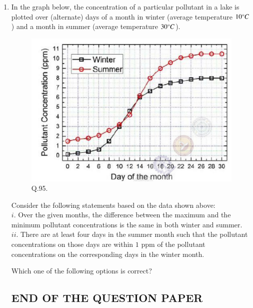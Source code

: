\documentclass[journal,12pt,onecolumn]{IEEEtran}
\theoremstyle{remark}
\begin{document}
\begin{enumerate}
    \item In the graph below, the concentration of a particular pollutant in a lake is plotted over (alternate) days of a month in winter (average temperature $10\degree C$) and a month in summer (average temperature $30\degree C$).
    
    \begin{figure}[H]
        \centering
        \includegraphics[width=0.5\columnwidth]{Figs/fig_14.png}
        \caption{Q.95.}
        \label{fig:placeholder_14}
    \end{figure}
    
    Consider the following statements based on the data shown above:\\
    $i$. Over the given months, the difference between the maximum and the minimum pollutant concentrations is the same in both winter and summer. \\
    $ii$. There are at least four days in the summer month such that the pollutant concentrations on those days are within $1$ ppm of the pollutant concentrations on the corresponding days in the winter month.
    
    Which one of the following options is correct? \hfill{}
        \begin{enumerate}
        \end{enumerate}
    

\centering\subsection*{END OF THE QUESTION PAPER}
\end{enumerate}
\end{document}
